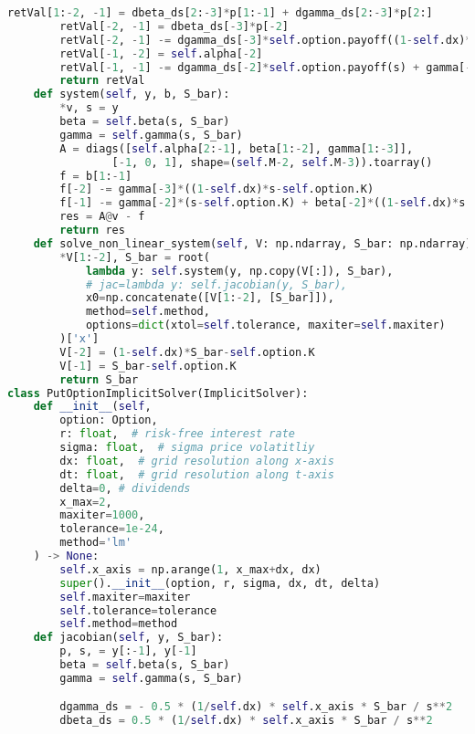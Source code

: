 \begin{lstlisting}[language=Python, caption=Implicit solver for Nielsen transformation]
        retVal[1:-2, -1] = dbeta_ds[2:-3]*p[1:-1] + dgamma_ds[2:-3]*p[2:]
        retVal[-2, -1] = dbeta_ds[-3]*p[-2]
        retVal[-2, -1] -= dgamma_ds[-3]*self.option.payoff((1-self.dx)*s) + gamma[-3]*(1 - self.dx)
        retVal[-1, -2] = self.alpha[-2]
        retVal[-1, -1] -= dgamma_ds[-2]*self.option.payoff(s) + gamma[-2] + dbeta_ds[-2]*self.option.payoff((1-self.dx)*s) - beta[1]*(1-self.dx)
        return retVal
    def system(self, y, b, S_bar):
        *v, s = y
        beta = self.beta(s, S_bar)
        gamma = self.gamma(s, S_bar)
        A = diags([self.alpha[2:-1], beta[1:-2], gamma[1:-3]],
                [-1, 0, 1], shape=(self.M-2, self.M-3)).toarray()
        f = b[1:-1]
        f[-2] -= gamma[-3]*((1-self.dx)*s-self.option.K)
        f[-1] -= gamma[-2]*(s-self.option.K) + beta[-2]*((1-self.dx)*s - self.option.K)
        res = A@v - f
        return res
    def solve_non_linear_system(self, V: np.ndarray, S_bar: np.ndarray):
        *V[1:-2], S_bar = root(
            lambda y: self.system(y, np.copy(V[:]), S_bar),
            # jac=lambda y: self.jacobian(y, S_bar),
            x0=np.concatenate([V[1:-2], [S_bar]]),
            method=self.method,
            options=dict(xtol=self.tolerance, maxiter=self.maxiter)
        )['x']
        V[-2] = (1-self.dx)*S_bar-self.option.K
        V[-1] = S_bar-self.option.K
        return S_bar
class PutOptionImplicitSolver(ImplicitSolver):
    def __init__(self, 
        option: Option,
        r: float,  # risk-free interest rate
        sigma: float,  # sigma price volatitliy
        dx: float,  # grid resolution along x-axis
        dt: float,  # grid resolution along t-axis
        delta=0, # dividends
        x_max=2,
        maxiter=1000,
        tolerance=1e-24,
        method='lm'
    ) -> None:
        self.x_axis = np.arange(1, x_max+dx, dx)
        super().__init__(option, r, sigma, dx, dt, delta)
        self.maxiter=maxiter
        self.tolerance=tolerance
        self.method=method
    def jacobian(self, y, S_bar):
        p, s, = y[:-1], y[-1]
        beta = self.beta(s, S_bar)
        gamma = self.gamma(s, S_bar)

        dgamma_ds = - 0.5 * (1/self.dx) * self.x_axis * S_bar / s**2
        dbeta_ds = 0.5 * (1/self.dx) * self.x_axis * S_bar / s**2


\end{lstlisting}

